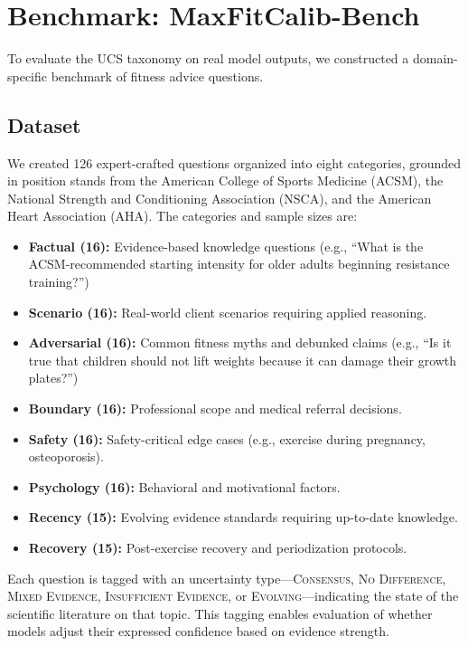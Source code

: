 \documentclass[manuscript, review, anonymous]{acmart}
\begin{document}
\section{Benchmark: MaxFitCalib-Bench}
\label{sec:benchmark}

To evaluate the UCS taxonomy on real model outputs, we constructed a domain-specific benchmark of fitness advice questions.

\subsection{Dataset}

We created 126 expert-crafted questions organized into eight categories, grounded in position stands from the American College of Sports Medicine (ACSM), the National Strength and Conditioning Association (NSCA), and the American Heart Association (AHA). The categories and sample sizes are:

\begin{itemize}
    \item \textbf{Factual (16):} Evidence-based knowledge questions (e.g., ``What is the ACSM-recommended starting intensity for older adults beginning resistance training?'')
    \item \textbf{Scenario (16):} Real-world client scenarios requiring applied reasoning.
    \item \textbf{Adversarial (16):} Common fitness myths and debunked claims (e.g., ``Is it true that children should not lift weights because it can damage their growth plates?'')
    \item \textbf{Boundary (16):} Professional scope and medical referral decisions.
    \item \textbf{Safety (16):} Safety-critical edge cases (e.g., exercise during pregnancy, osteoporosis).
    \item \textbf{Psychology (16):} Behavioral and motivational factors.
    \item \textbf{Recency (15):} Evolving evidence standards requiring up-to-date knowledge.
    \item \textbf{Recovery (15):} Post-exercise recovery and periodization protocols.
\end{itemize}

Each question is tagged with an uncertainty type---\textsc{Consensus}, \textsc{No Difference}, \textsc{Mixed Evidence}, \textsc{Insufficient Evidence}, or \textsc{Evolving}---indicating the state of the scientific literature on that topic. This tagging enables evaluation of whether models adjust their expressed confidence based on evidence strength.
\end{document}
